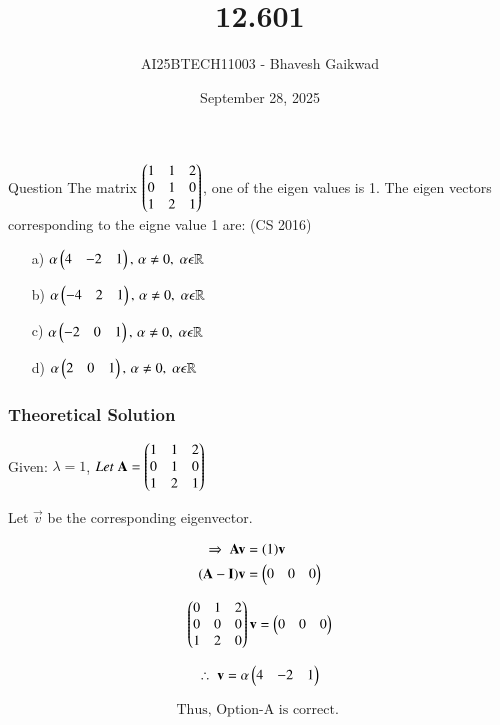 \documentclass{beamer}
\title
{12.601}
\date{September 28, 2025}
\author 
{AI25BTECH11003 - Bhavesh Gaikwad}
\begin{document}
\frame{\titlepage}
\begin{frame}{Question}
The matrix $\begin{pmatrix}1 & 1 & 2 \\ 0 & 1 & 0 \\ 1 & 2 & 1\end{pmatrix}$, one of the eigen values is 1. The eigen vectors corresponding to the eigne value 1 are:
\hfill{(CS 2016)}\\

\begin{itemize}
    \item[a)] $\alpha\begin{pmatrix}4 & -2 & 1\end{pmatrix}, \, \alpha \neq 0, \; \alpha \epsilon \mathbb{R}$
    \item[b)] $\alpha\begin{pmatrix}-4 & 2 & 1\end{pmatrix}, \, \alpha \neq 0, \; \alpha \epsilon \mathbb{R}$
    \item[c)]$\alpha\begin{pmatrix}-2 & 0 & 1\end{pmatrix}, \, \alpha \neq 0, \; \alpha \epsilon \mathbb{R}$
    \item[d)]$\alpha\begin{pmatrix}2 & 0 & 1\end{pmatrix}, \, \alpha \neq 0, \; \alpha \epsilon \mathbb{R}$
\end{itemize}
\end{frame}


\begin{frame}[fragile]
    \frametitle{Theoretical Solution}
Given: $\lambda = 1$, $Let \; \mathbf{A} = \begin{pmatrix}1 & 1 & 2 \\ 0 & 1 & 0 \\ 1 & 2 & 1\end{pmatrix}$

Let $\vec{v}$ be the corresponding eigenvector.

\begin{align}
    \Rightarrow \; \mathbf{A}\mathbf{v} &= (1)\mathbf{v} \\ 
    (\mathbf{A} - \mathbf{I})\mathbf{v} &= \begin{pmatrix}0 & 0 & 0\end{pmatrix}
\end{align}

\begin{equation}
\begin{pmatrix}0 & 1 & 2 \\ 0 & 0 & 0 \\ 1 & 2 & 0\end{pmatrix}\mathbf{v} = \begin{pmatrix}0 & 0 & 0\end{pmatrix}    
\end{equation}

\begin{equation}
    \therefore \; \mathbf{v} = \alpha \begin{pmatrix}4 & -2 & 1\end{pmatrix} 
\end{equation}

\begin{align*}
    \boxed{\text{Thus, Option-A is correct. }}
\end{align*}
\end{frame}
\end{document}
